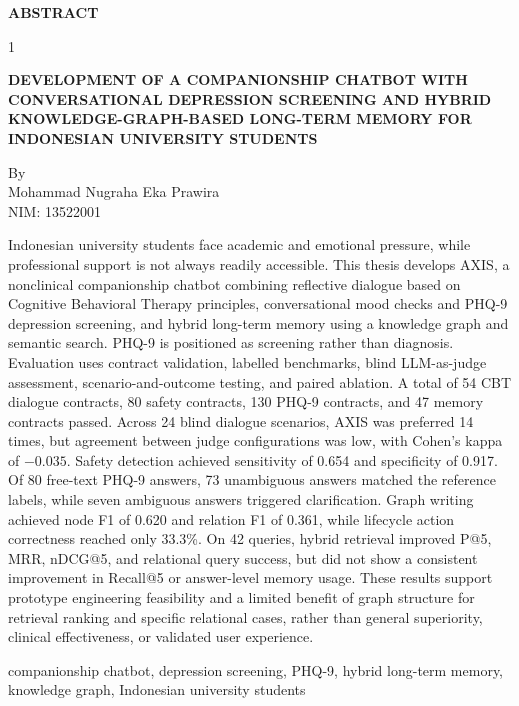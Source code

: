 \begin{center}
{\bfseries\large ABSTRACT}
\end{center}

\vspace{0.5cm}

\begin{spacing}{1}
\begin{center}
{\bfseries DEVELOPMENT OF A COMPANIONSHIP CHATBOT WITH CONVERSATIONAL DEPRESSION SCREENING AND HYBRID KNOWLEDGE-GRAPH-BASED LONG-TERM MEMORY FOR INDONESIAN UNIVERSITY STUDENTS}
\end{center}

\vspace{0.3cm}

\begin{center}
By \\
Mohammad Nugraha Eka Prawira \\
NIM: 13522001
\end{center}

\vspace{0.5cm}

Indonesian university students face academic and emotional pressure, while professional support is not always readily accessible. This thesis develops AXIS, a nonclinical companionship chatbot combining reflective dialogue based on Cognitive Behavioral Therapy principles, conversational mood checks and PHQ-9 depression screening, and hybrid long-term memory using a knowledge graph and semantic search. PHQ-9 is positioned as screening rather than diagnosis. Evaluation uses contract validation, labelled benchmarks, blind LLM-as-judge assessment, scenario-and-outcome testing, and paired ablation. A total of 54 CBT dialogue contracts, 80 safety contracts, 130 PHQ-9 contracts, and 47 memory contracts passed. Across 24 blind dialogue scenarios, AXIS was preferred 14 times, but agreement between judge configurations was low, with Cohen's kappa of $-0.035$. Safety detection achieved sensitivity of 0.654 and specificity of 0.917. Of 80 free-text PHQ-9 answers, 73 unambiguous answers matched the reference labels, while seven ambiguous answers triggered clarification. Graph writing achieved node F1 of 0.620 and relation F1 of 0.361, while lifecycle action correctness reached only 33.3\%. On 42 queries, hybrid retrieval improved P@5, MRR, nDCG@5, and relational query success, but did not show a consistent improvement in Recall@5 or answer-level memory usage. These results support prototype engineering feasibility and a limited benefit of graph structure for retrieval ranking and specific relational cases, rather than general superiority, clinical effectiveness, or validated user experience.

 companionship chatbot, depression screening, PHQ-9, hybrid long-term memory, knowledge graph, Indonesian university students
\end{spacing}
